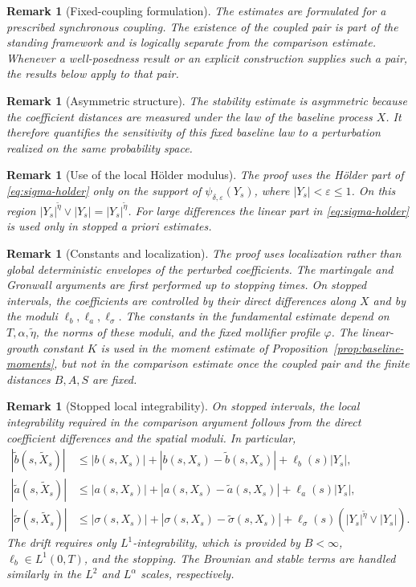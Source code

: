 \documentclass[11pt]{article}
\newtheorem{remark}[theorem]{Remark}
\newcommand{\1}{\mathbf{1}}
\newcommand{\wt}{\tilde}
\newcommand{\eps}{\varepsilon}
\begin{document}
\begin{remark}[Fixed-coupling formulation]
The estimates are formulated for a prescribed synchronous coupling. The existence of the coupled pair is part of the standing framework and is logically separate from the comparison estimate. Whenever a well-posedness result or an explicit construction supplies such a pair, the results below apply to that pair.
\end{remark}

\begin{remark}[Asymmetric structure]
The stability estimate is asymmetric because the coefficient distances are measured under the law of the baseline process $X$. It therefore quantifies the sensitivity of this fixed baseline law to a perturbation realized on the same probability space.
\end{remark}

\begin{remark}[Use of the local H\"older modulus]
The proof uses the H\"older part of \eqref{eq:sigma-holder} only on the support of $\psi_{\delta,\eps}(Y_s)$, where $|Y_s|<\eps\le1$. On this region $|Y_s|^{\wt\eta}\vee |Y_s|=|Y_s|^{\wt\eta}$. For large differences the linear part in \eqref{eq:sigma-holder} is used only in stopped a priori estimates.
\end{remark}

\begin{remark}[Constants and localization]
The proof uses localization rather than global deterministic envelopes of the perturbed coefficients. The martingale and Gronwall arguments are first performed up to stopping times. On stopped intervals, the coefficients are controlled by their direct differences along $X$ and by the moduli $\ell_b,\ell_a,\ell_\sigma$. The constants in the fundamental estimate depend on $T,\alpha,\wt\eta$, the norms of these moduli, and the fixed mollifier profile $\varphi$. The linear-growth constant $K$ is used in the moment estimate of Proposition~\ref{prop:baseline-moments}, but not in the comparison estimate once the coupled pair and the finite distances $B,A,S$ are fixed.
\end{remark}

\begin{remark}[Stopped local integrability]
On stopped intervals, the local integrability required in the comparison argument follows from the direct coefficient differences and the spatial moduli. In particular,
\begin{align*}
|\wt b(s,\wt X_s)|&\le |b(s,X_s)|+|b(s,X_s)-\wt b(s,X_s)|+\ell_b(s)|Y_s|,\\
|\wt a(s,\wt X_s)|&\le |a(s,X_s)|+|a(s,X_s)-\wt a(s,X_s)|+\ell_a(s)|Y_s|,\\
|\wt\sigma(s,\wt X_s)|&\le |\sigma(s,X_s)|+|\sigma(s,X_s)-\wt\sigma(s,X_s)|
 +\ell_\sigma(s)(|Y_s|^{\wt\eta}\vee |Y_s|).
\end{align*}
The drift requires only $L^1$-integrability, which is provided by $B<\infty$, $\ell_b\in L^1(0,T)$, and the stopping. The Brownian and stable terms are handled similarly in the $L^2$ and $L^\alpha$ scales, respectively.
\end{remark}
\end{document}
